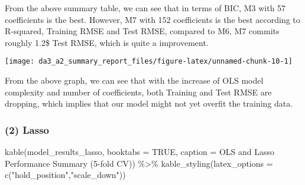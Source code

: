 \documentclass[
]{article}
\newenvironment{Shaded}{\begin{snugshade}}{\end{snugshade}}
\newcommand{\AttributeTok}[1]{\textcolor[rgb]{0.77,0.63,0.00}{#1}}
\newcommand{\ConstantTok}[1]{\textcolor[rgb]{0.00,0.00,0.00}{#1}}
\newcommand{\FunctionTok}[1]{\textcolor[rgb]{0.00,0.00,0.00}{#1}}
\newcommand{\NormalTok}[1]{#1}
\newcommand{\SpecialCharTok}[1]{\textcolor[rgb]{0.00,0.00,0.00}{#1}}
\newcommand{\StringTok}[1]{\textcolor[rgb]{0.31,0.60,0.02}{#1}}
\begin{document}
From the above summary table, we can see that in terms of BIC, M3 with
57 coefficients is the best. However, M7 with 152 coefficients is the
best according to R-squared, Training RMSE and Test RMSE, compared to
M6, M7 commits roughly 1.2\$ Test RMSE, which is quite a improvement.

\begin{center}\texttt{[image: da3\_a2\_summary\_report\_files/figure-latex/unnamed-chunk-10-1]} \end{center}

From the above graph, we can see that with the increase of OLS model
complexity and number of coefficients, both Training and Test RMSE are
dropping, which implies that our model might not yet overfit the
training data.

\hypertarget{lasso}{%
\subsubsection{(2) Lasso}\label{lasso}}

\begin{Shaded}
\begin{Highlighting}[]
\FunctionTok{kable}\NormalTok{(model\_results\_lasso, }\AttributeTok{booktabs =} \ConstantTok{TRUE}\NormalTok{, }\AttributeTok{caption =} \StringTok{\textquotesingle{}OLS and Lasso Performance Summary (5{-}fold CV)\textquotesingle{}}\NormalTok{) }\SpecialCharTok{\%\textgreater{}\%} \FunctionTok{kable\_styling}\NormalTok{(}\AttributeTok{latex\_options =} \FunctionTok{c}\NormalTok{(}\StringTok{"hold\_position"}\NormalTok{,}\StringTok{"scale\_down"}\NormalTok{))}
\end{Highlighting}
\end{Shaded}

\begin{table}[!h]

\caption{\label{tab:unnamed-chunk-14}OLS and Lasso Performance Summary (5-fold CV)}
\centering
{}
\end{table}
\end{document}
